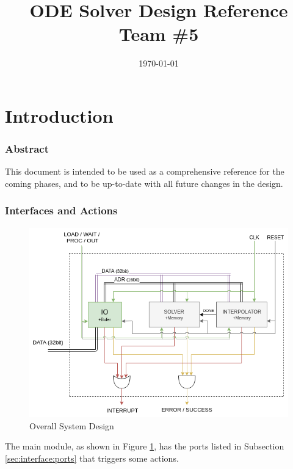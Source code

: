 \documentclass[12pt]{report}
\title{\textbf{ODE Solver Design Reference}\\Team \#5}
\date{\today}
\begin{document}
\thispagestyle{empty}

\maketitle
\tableofcontents
\listoffigures
\listoftables
\clearpage


\part{Introduction}
\section{Abstract}
This document is intended to be used as a comprehensive reference for the coming phases, and to be up-to-date with all future changes in the design.

\section{Interfaces and Actions}
\begin{center}
    \begin{figure}[hp]
        \centering
        \includegraphics[width=\textwidth]{images/d1}
        \caption{Overall System Design}
        \label{fig:overall}
    \end{figure}
\end{center}

The main module, as shown in Figure \ref{fig:overall}, has the ports listed in Subsection \ref{sec:interface:ports} that triggers some actions. 
\end{document}
